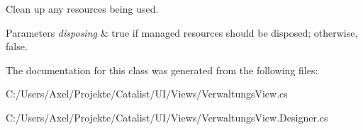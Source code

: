 Clean up any resources being used. 


\begin{DoxyParams}{Parameters}
{\em disposing} & true if managed resources should be disposed; otherwise, false.\\
\hline
\end{DoxyParams}


The documentation for this class was generated from the following files\+:\begin{DoxyCompactItemize}
\item 
C\+:/\+Users/\+Axel/\+Projekte/\+Catalist/\+U\+I/\+Views/Verwaltungs\+View.\+cs\item 
C\+:/\+Users/\+Axel/\+Projekte/\+Catalist/\+U\+I/\+Views/Verwaltungs\+View.\+Designer.\+cs\end{DoxyCompactItemize}

